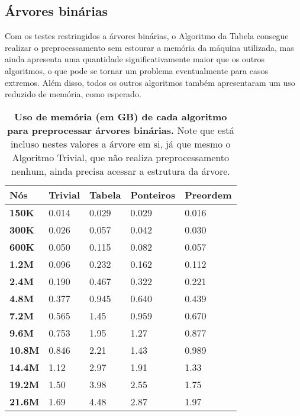 \subsection{Árvores binárias}
Com os testes restringidos a árvores binárias, o Algoritmo da Tabela consegue realizar
o preprocessamento sem estourar a memória da máquina utilizada, mas ainda apresenta uma
quantidade significativamente maior que os outros algoritmos, o que pode se tornar
um problema eventualmente para casos extremos. Além disso, todos os outros algoritmos
também apresentaram um uso reduzido de memória, como esperado.

\begin{table}[H]
  \begin{tabular}{|l|l|l|l|l|}
  \hline
  \textbf{Nós}   & \textbf{Trivial} & \textbf{Tabela} & \textbf{Ponteiros} & \textbf{Preordem} \\ \hline
  \textbf{150K}  & 0.014            & 0.029             & 0.029              & 0.016             \\ \hline
  \textbf{300K}  & 0.026            & 0.057             & 0.042              & 0.030             \\ \hline
  \textbf{600K}  & 0.050            & 0.115             & 0.082              & 0.057             \\ \hline
  \textbf{1.2M}  & 0.096            & 0.232             & 0.162              & 0.112             \\ \hline
  \textbf{2.4M}  & 0.190            & 0.467             & 0.322              & 0.221             \\ \hline
  \textbf{4.8M}  & 0.377            & 0.945             & 0.640              & 0.439             \\ \hline
  \textbf{7.2M}  & 0.565            & 1.45              & 0.959              & 0.670             \\ \hline
  \textbf{9.6M}  & 0.753            & 1.95              & 1.27               & 0.877             \\ \hline
  \textbf{10.8M} & 0.846            & 2.21              & 1.43               & 0.989             \\ \hline
  \textbf{14.4M} & 1.12             & 2.97              & 1.91               & 1.33              \\ \hline
  \textbf{19.2M} & 1.50             & 3.98              & 2.55               & 1.75              \\ \hline
  \textbf{21.6M} & 1.69             & 4.48              & 2.87               & 1.97              \\ \hline
  \end{tabular}
  \caption[Uso de memória (em GB) de cada algoritmo para preprocessar árvores binárias.]
  {\textbf{Uso de memória (em GB) de cada algoritmo para preprocessar árvores binárias.}
   Note que está incluso nestes valores a árvore em si, já que mesmo o Algoritmo Trivial,
   que não realiza preprocessamento nenhum, ainda precisa acessar a estrutura da árvore.}
  \end{table}

